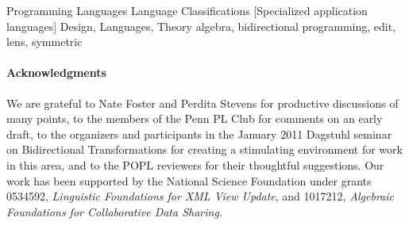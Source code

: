 \documentclass{sigplanconf}
\begin{document}
    {Programming Languages}
    {Language Classifications}
    [Specialized application languages]
\terms Design, Languages, Theory
\keywords algebra, bidirectional programming, edit, lens, symmetric



\ifanon \else \paragraph*{Acknowledgments}
We are grateful to
Nate Foster and Perdita Stevens for productive discussions of many points,
to the members of the Penn PL Club for comments on an early draft, to
the organizers and participants in the January 2011 Dagstuhl seminar on
Bidirectional Transformations for creating a stimulating environment for work
in this area, and to the POPL reviewers for their thoughtful suggestions.  Our work has been supported by the National Science 
Foundation under grants 0534592, \emph{Linguistic Foundations for XML View
  Update}, and 1017212, \emph{Algebraic Foundations for Collaborative Data
  Sharing}.  \fi

\let\section\OLDsection

\iffull\else\vfill\eject\fi


\end{document}
